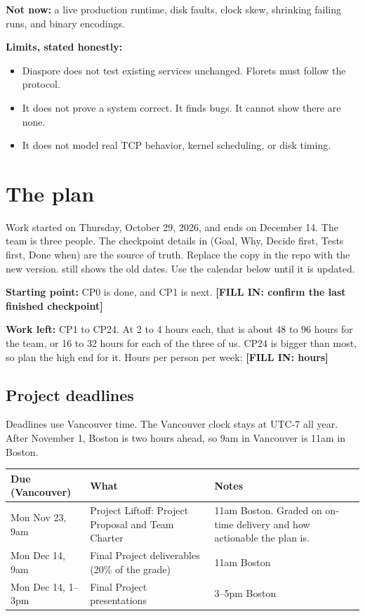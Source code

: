 \documentclass[12pt,letterpaper]{article}
\newcommand{\code}[1]{\texttt{\detokenize{#1}}}
\newcommand{\lbl}[1]{\textbf{#1}\enspace}
\newcommand{\fillin}[1]{\textbf{[FILL IN: #1]}}
\begin{document}
\lbl{Not now:} a live production runtime, disk faults, clock skew, shrinking failing runs, and binary encodings.

\lbl{Limits, stated honestly:}

\begin{itemize}
  \item Diaspore does not test existing services unchanged. Florets must follow the protocol.
  \item It does not prove a system correct. It finds bugs. It cannot show there are none.
  \item It does not model real TCP behavior, kernel scheduling, or disk timing.
\end{itemize}

\section{The plan}

Work started on Thursday, October 29, 2026, and ends on December 14. The team is three people. The checkpoint details in \code{docs/build-guide.pdf} (Goal, Why, Decide first, Tests first, Done when) are the source of truth. Replace the copy in the repo with the new version. \code{docs/plan.md} still shows the old dates. Use the calendar below until it is updated.

\lbl{Starting point:} CP0 is done, and CP1 is next. \fillin{confirm the last finished checkpoint}

\lbl{Work left:} CP1 to CP24. At 2 to 4 hours each, that is about 48 to 96 hours for the team, or 16 to 32 hours for each of the three of us. CP24 is bigger than most, so plan the high end for it. Hours per person per week: \fillin{hours}

\subsection*{Project deadlines}

Deadlines use Vancouver time. The Vancouver clock stays at UTC-7 all year. After November 1, Boston is two hours ahead, so 9am in Vancouver is 11am in Boston.

\begin{center}
\small
\begin{tabularx}{\linewidth}{@{}l X X@{}}
\toprule
\textbf{Due (Vancouver)} & \textbf{What} & \textbf{Notes} \\
\midrule
Mon Nov 23, 9am & Project Liftoff: Project Proposal and Team Charter & 11am Boston. Graded on on-time delivery and how actionable the plan is. \\
Mon Dec 14, 9am & Final Project deliverables (20\% of the grade) & 11am Boston \\
Mon Dec 14, 1--3pm & Final Project presentations & 3--5pm Boston \\
\bottomrule
\end{tabularx}
\end{center}
\end{document}
